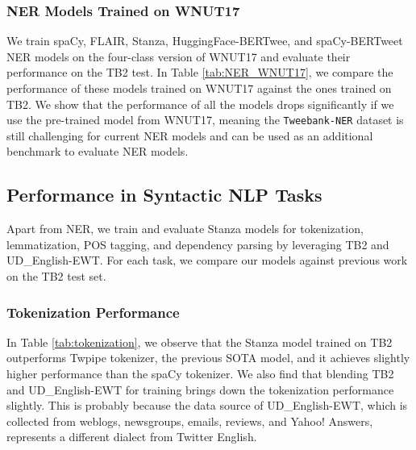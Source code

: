 \documentclass[10pt, a4paper]{article}
\begin{document}
\subsubsection{NER Models Trained on WNUT17}

We train spaCy, FLAIR, Stanza, HuggingFace-BERTwee, and spaCy-BERTweet NER models on the four-class version of WNUT17 and evaluate their performance on the TB2 test. In Table \ref{tab:NER_WNUT17}, we compare the performance of these models trained on WNUT17 against the ones trained on TB2. We show that the performance of all the models drops significantly if we use the pre-trained model from WNUT17, meaning the \texttt{Tweebank-NER} dataset is still challenging for current NER models and can be used as an additional benchmark to evaluate NER models.







\subsection{Performance in Syntactic NLP Tasks}

Apart from NER, we train and evaluate Stanza models for tokenization, lemmatization, POS tagging, and dependency parsing by leveraging TB2 and UD\_English-EWT. For each task, we compare our models against previous work on the TB2 test set. 


\subsubsection{Tokenization Performance}


In Table \ref{tab:tokenization}, we observe that the Stanza model trained on TB2 outperforms Twpipe tokenizer, the previous SOTA model, and it achieves slightly higher performance than the spaCy tokenizer. We also find that blending TB2 and UD\_English-EWT for training brings down the tokenization performance slightly. This is probably because the data source of UD\_English-EWT, which is collected from weblogs, newsgroups, emails, reviews, and Yahoo! Answers, represents a different dialect from Twitter English. 
\end{document}
